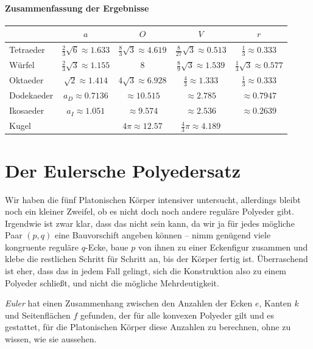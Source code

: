 \documentclass[11pt]{article}
\begin{document}
\paragraph{Zusammenfassung der Ergebnisse}
\begin{center}
  \begin{tabular}{|l|c|c|c|c|}\hline
    & $a$ & $O$ & $V$ & $r$ \\\hline
    Tetraeder & $\frac23\sqrt{6}\approx 1.633$ & $\frac83\sqrt{3} \approx
    4.619$ & $\frac{8}{27}\sqrt{3} \approx 0.513$ & $\frac13 \approx 0.333$\\ 
    Würfel & $\frac23\sqrt{3}\approx 1.155$ & $8$ & $\frac{8}{9}\sqrt{3}
    \approx 1.539$ & $\frac13\sqrt{3} \approx 0.577$ \\
    Oktaeder & $\sqrt{2}\approx 1.414$ & $4\sqrt{3}\approx 6.928$ &
    $\frac43 \approx 1.333$ & $\frac13 \approx 0.333$ \\
    Dodekaeder & $a_D\approx 0.7136$ & $\approx 10.515$ & $\approx 2.785$ &
    $\approx 0.7947$ \\ 
    Ikosaeder & $a_I\approx 1.051$ & $\approx 9.574$ & $ \approx 2.536$ &
    $\approx 0.2639$ \\
    Kugel &  & $4\pi\approx 12.57$ & $ \frac43\pi \approx 4.189$ & \\\hline 
  \end{tabular}
\end{center}

\section*{Der Eulersche Polyedersatz}

Wir haben die fünf Platonischen Körper intensiver untersucht, allerdings
bleibt noch ein kleiner Zweifel, ob es nicht doch noch andere reguläre
Polyeder gibt.  Irgendwie ist zwar klar, dass das nicht sein kann, da wir ja
für jedes mögliche Paar $(p,q)$ eine Bauvorschift angeben können -- nimm
genügend viele kongruente reguläre $q$-Ecke, baue $p$ von ihnen zu einer
Eckenfigur zusammen und klebe die restlichen Schritt für Schritt an, bis der
Körper fertig ist.  Überraschend ist eher, dass das in jedem Fall gelingt,
sich die Konstruktion also zu einem Polyeder schließt, und nicht die mögliche
Mehrdeutigkeit. 

\emph{Euler} hat einen Zusammenhang zwischen den Anzahlen der Ecken $e$,
Kanten $k$ und Seitenflächen $f$ gefunden, der für alle konvexen Polyeder gilt
und es gestattet, für die Platonischen Körper diese Anzahlen zu berechnen,
ohne zu wissen, wie sie aussehen.
\end{document}
